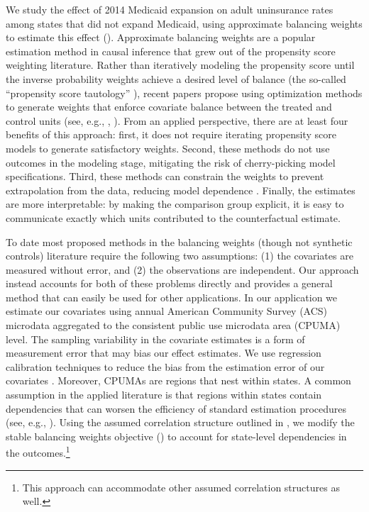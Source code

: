 \documentclass[aoas]{imsart}
\theoremstyle{plain}
\theoremstyle{remark}
\begin{document}
We study the effect of 2014 Medicaid expansion on adult uninsurance rates among states that did not expand Medicaid, using approximate balancing weights to estimate this effect (\cite{wang2017minimal}). Approximate balancing weights are a popular estimation method in causal inference that grew out of the propensity score weighting literature. Rather than iteratively modeling the propensity score until the inverse probability weights achieve a desired level of balance (the so-called ``propensity score tautology'' \cite{imai2014covariate}), recent papers propose using optimization methods to generate weights that enforce covariate balance between the treated and control units (see, e.g., \cite{imai2014covariate}, \cite{zubizarreta2015stable}). From an applied perspective, there are at least four benefits of this approach: first, it does not require iterating propensity score models to generate satisfactory weights. Second, these methods do not use outcomes in the modeling stage, mitigating the risk of cherry-picking model specifications. Third, these methods can constrain the weights to prevent extrapolation from the data, reducing model dependence \cite{zubizarreta2015stable}. Finally, the estimates are more interpretable: by making the comparison group explicit, it is easy to communicate exactly which units contributed to the counterfactual estimate.

To date most proposed methods in the balancing weights (though not synthetic controls) literature require the following two assumptions: (1) the covariates are measured without error, and (2) the observations are independent. Our approach instead accounts for both of these problems directly and provides a general method that can easily be used for other applications. In our application we estimate our covariates using annual American Community Survey (ACS) microdata aggregated to the consistent public use microdata area (CPUMA) level. The sampling variability in the covariate estimates is a form of measurement error that may bias our effect estimates. We use regression calibration techniques to reduce the bias from the estimation error of our covariates \cite{gleser1992importance}. Moreover, CPUMAs are regions that nest within states. A common assumption in the applied literature is that regions within states contain dependencies that can worsen the efficiency of standard estimation procedures (see, e.g., \cite{cameron2015practitioner}). Using the assumed correlation structure outlined in \cite{kloek1981ols}, we modify the stable balancing weights objective (\cite{zubizarreta2015stable}) to account for state-level dependencies in the outcomes.\footnote{This approach can accommodate other assumed correlation structures as well.}
\end{document}
